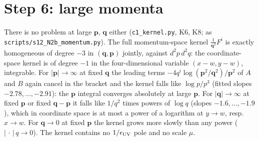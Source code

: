\documentclass[11pt]{article}
\newcommand{\vq}{\mathbf{q}}
\newcommand{\vp}{\mathbf{p}}
\begin{document}
\section{Step 6: large momenta}
There is no problem at large $\vp$, $\vq$ either (\texttt{c1\_kernel.py}, K6, K8; as \texttt{scripts/s12\_N2b\_momentum.py}). The full momentum-space kernel $\frac{1}{\vq^{2}}F^{i}$ is exactly homogeneous of degree $-3$ in $(\vq,\vp)$ jointly, against $d^{2}p\,d^{2}q$: the coordinate-space kernel is of degree $-1$ in the four-dimensional variable $(x-w,y-w)$, integrable. For $|\vp|\to\infty$ at fixed $\vq$ the leading terms $-4q^{i}\log(\vp^{2}/\vq^{2})/\vp^{2}$ of $A$ and $B$ again cancel in the bracket and the kernel falls like $\log p/p^{3}$ (fitted slopes $-2.78,\dots,-2.91$): the $\vp$ integral converges absolutely at large $\vp$. For $|\vq|\to\infty$ at fixed $\vp$ or fixed $\vq-\vp$ it falls like $1/q^{2}$ times powers of $\log q$ (slopes $-1.6,\dots,-1.9$), which in coordinate space is at most a power of a logarithm at $y\to w$, resp.\ $x\to w$. For $\vq\to0$ at fixed $\vp$ the kernel grows more slowly than any power ($|\,\cdot\,|\,q\to0$). The kernel contains no $1/\epsilon_{\rm UV}$ pole and no scale $\mu$.
\end{document}

